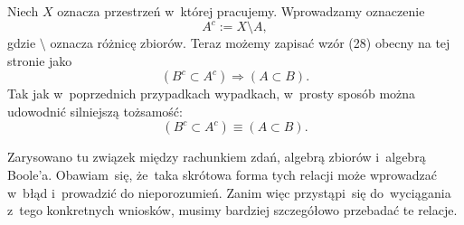 \documentclass[a4paper,11pt]{article}
\begin{document}
 Niech $X$ oznacza przestrzeń w~której pracujemy. Wprowadzamy
oznaczenie
\begin{equation}
  \label{eq:Kuratowski-Wstep-do-teorii-mnogosci-ETC-08}
  A^{ c } := X \setminus A,
\end{equation}
gdzie $\setminus$ oznacza różnicę zbiorów. Teraz możemy zapisać wzór (28)
obecny na tej stronie jako
\begin{equation}
  \label{eq:Kuratowski-Wstep-do-teorii-mnogosci-ETC-09}
  ( B^{ c } \subset A^{ c } ) \Rightarrow ( A \subset B ).
\end{equation}
Tak jak w~poprzednich przypadkach wypadkach, w~prosty sposób można
udowodnić silniejszą tożsamość:
\begin{equation}
  \label{eq:Kuratowski-Wstep-do-teorii-mnogosci-ETC-10}
  ( B^{ c } \subset A^{ c } ) \equiv ( A \subset B ).
\end{equation}

\vspace{\spaceFour}





 Zarysowano tu związek między rachunkiem zdań, algebrą zbiorów
i~algebrą Boole'a. Obawiam~się, że~taka skrótowa forma tych relacji może
wprowadzać w~błąd i~prowadzić do nieporozumień. Zanim więc przystąpi~się
do~wyciągania z~tego konkretnych wniosków, musimy bardziej szczegółowo
przebadać te relacje.

\vspace{\spaceFour}














\vspace{\spaceFive}
\end{document}
